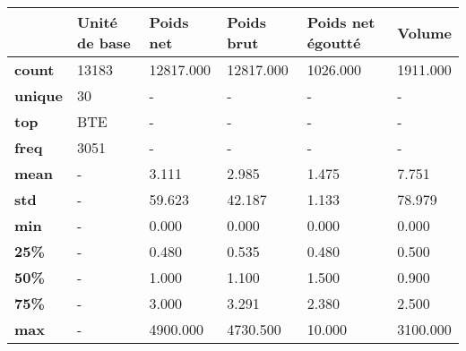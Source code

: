 \begin{tabular}{lXXXXX}
\toprule
{} & Unité de base &  Poids net &  Poids brut &  Poids net égoutté &    Volume \\
\midrule
\textbf{count } &         13183 &  12817.000 &   12817.000 &           1026.000 &  1911.000 \\
\textbf{unique} &            30 &          - &           - &                  - &         - \\
\textbf{top   } &           BTE &          - &           - &                  - &         - \\
\textbf{freq  } &          3051 &          - &           - &                  - &         - \\
\textbf{mean  } &             - &      3.111 &       2.985 &              1.475 &     7.751 \\
\textbf{std   } &             - &     59.623 &      42.187 &              1.133 &    78.979 \\
\textbf{min   } &             - &      0.000 &       0.000 &              0.000 &     0.000 \\
\textbf{25\%   } &             - &      0.480 &       0.535 &              0.480 &     0.500 \\
\textbf{50\%   } &             - &      1.000 &       1.100 &              1.500 &     0.900 \\
\textbf{75\%   } &             - &      3.000 &       3.291 &              2.380 &     2.500 \\
\textbf{max   } &             - &   4900.000 &    4730.500 &             10.000 &  3100.000 \\
\bottomrule
\end{tabular}
